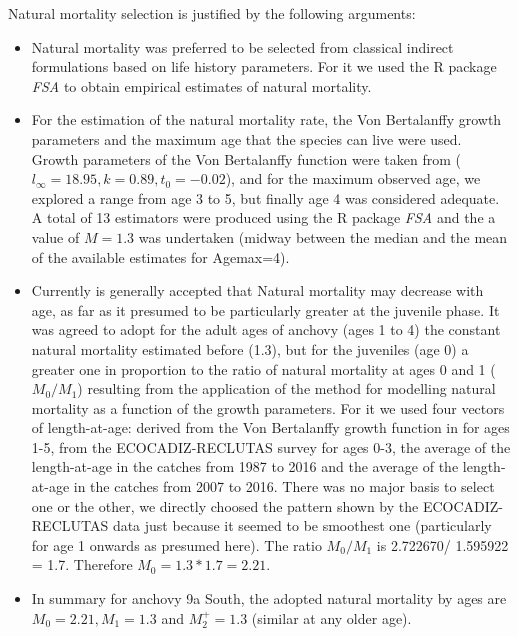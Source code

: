 \documentclass[review]{elsarticle}
\begin{document}
 Natural mortality selection is justified by the following arguments:
 \begin{itemize}
\item  Natural mortality was preferred to be selected from classical indirect formulations based on life history parameters. For it we used the R package \textit{FSA} to obtain empirical estimates of natural mortality.  
\item For the estimation of the  natural mortality rate, the Von Bertalanffy growth parameters and the maximum age that the species can live were used. Growth parameters of the Von Bertalanffy function were taken from \citet{Bellido2000} ($l_{\infty} =18.95, k =  0.89, t_{0} = -0.02$), and for the maximum observed age, we explored a range from age 3 to 5, but finally age 4 was considered adequate. A total of 13 estimators were produced using the R package \textit{FSA} and the a value of $M=1.3$ was undertaken (midway between the median and the mean of the available estimates for Agemax=4).  
\item Currently is generally accepted that Natural mortality may decrease with age, as far as it presumed to be particularly greater at the juvenile phase. It was agreed to adopt for the adult ages of anchovy (ages 1 to 4) the constant natural mortality estimated before (1.3), but for the juveniles (age 0) a greater one in proportion to the ratio of natural mortality at ages 0 and 1 ($M_{0}/M_{1}$) resulting from the application of the \citet{gislason2010size} method for modelling natural mortality as a function of the growth parameters.  For it we used four vectors of length-at-age: derived from the Von Bertalanffy growth function in \citet{Bellido2000} for ages 1-5, from the ECOCADIZ-RECLUTAS survey  for ages 0-3, the average of the length-at-age in the catches from 1987 to 2016 and the average of the length-at-age in the catches from 2007 to 2016. There was no major basis to select one or the other, we directly choosed the pattern shown by the ECOCADIZ-RECLUTAS data just because it seemed to be smoothest one (particularly for age 1 onwards as presumed here). The ratio $M_{0}/M_{1}$ is 2.722670/ 1.595922 = 1.7. Therefore $M_0=1.3*1.7= 2.21.$
\item In summary for anchovy 9a South, the adopted natural mortality by ages are $M_0=2.21, M_1=1.3$ and $M_2^+=1.3$ (similar at any older age).
\end{itemize}


\end{document}
